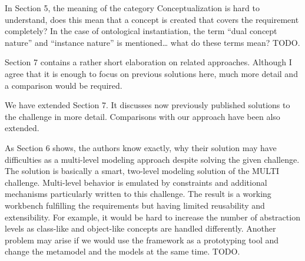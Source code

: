 \documentclass[10pt]{article}
\begin{document}
\begin{response}{In Section 5, the meaning of the category Conceptualization is hard to understand, does this mean that a concept is created that covers the requirement completely? In the case of ontological instantiation, the term “dual concept nature” and “instance nature” is mentioned… what do these terms mean?} 
TODO.
\end{response}

\begin{response}{Section 7 contains a rather short elaboration on related approaches. Although I agree that it is enough to focus on previous solutions here, much more detail and a comparison would be required.} 

We have extended Section 7. It discusses now previously published solutions to the challenge in more detail. Comparisons with our approach have been also extended.

\end{response}

\begin{response}{As Section 6 shows, the authors know exactly, why their solution may have difficulties as a multi-level modeling approach despite solving the given challenge. The solution is basically a smart, two-level modeling solution of the MULTI challenge. Multi-level behavior is emulated by constraints and additional mechanisms particularly written to this challenge. The result is a working workbench fulfilling the requirements but having limited reusability and extensibility. For example, it would be hard to increase the number of abstraction levels as class-like and object-like concepts are handled differently. Another problem may arise if we would use the framework as a prototyping tool and change the metamodel and the models at the same time.} 
TODO.
\end{response}
\end{document}
